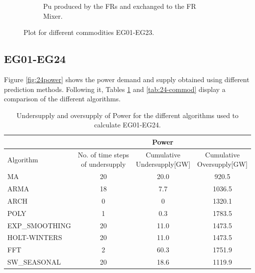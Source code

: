 \documentclass[11pt,letterpaper]{article}
\begin{document}
\begin{figure}[!htbp]
\begin{subfigure}[t]{.45\textwidth}
	\caption{Pu produced by the FRs and exchanged to the FR Mixer.}
	\label{fig:23-arch-frpu}
\end{subfigure}
	\hfill
	\caption{Plot for different commodities EG01-EG23.}
	\label{fig:23-arch-commod}
\end{figure}

\subsection{EG01-EG24}

Figure \ref{fig:24power} shows the power demand and supply obtained using different prediction methods. Following it, Tables \ref{tab:24-power} and \ref{tab:24-commod} display a comparison of the different algorithms.

\begin{table}[!h]
	\centering
	\caption {Undersupply and oversupply of Power for the different algorithms used to calculate EG01-EG24.}
	\label{tab:24-power}
	\begin{tabular}{|l|c|c|c|}
		\hline
		& \multicolumn{3}{c|}{Power} \\ \hline
		Algorithm & \shortstack{No. of time steps\\of undersupply}  & 
		\shortstack{Cumulative\\Undersupply[GW]}  & \shortstack{Cumulative\\Oversupply[GW]} \\ \hline
		MA        & 20 	& 20.0  &  920.5   \\ \hline
		ARMA      & 18 	&  7.7  &  1036.5  \\ \hline
		ARCH      &  0 	&   0  	&  1320.1  \\ \hline
		POLY      &  1 	&  0.3 	&  1783.5  \\ \hline
		EXP\_SMOOTHING 	& 20 	& 11.0 & 1473.5 \\ \hline
		HOLT-WINTERS  	& 20 	& 11.0 & 1473.5 \\ \hline
		FFT       & 2 	& 60.3 	& 1751.9	\\ \hline
		SW\_SEASONAL    & 20 	& 18.6 	& 1119.9 	\\ \hline
	\end{tabular}
\end{table}
\end{document}

